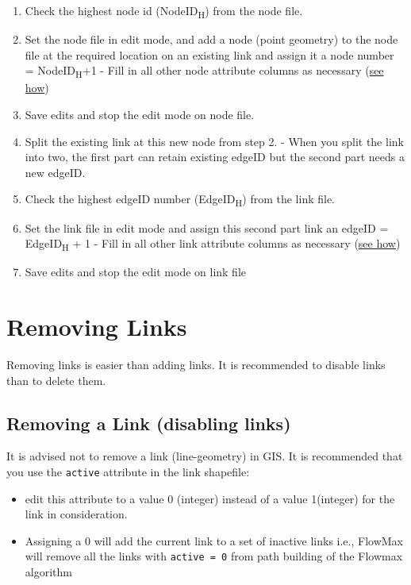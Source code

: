 \documentclass[
]{book}
\providecommand{\tightlist}{%
  \setlength{\itemsep}{0pt}\setlength{\parskip}{0pt}}
\begin{document}
\begin{enumerate}
\def\labelenumi{\arabic{enumi}.}
\tightlist
\item
  Check the highest node id (NodeID\textsubscript{H}) from the node file.
\item
  Set the node file in edit mode, and add a node (point geometry) to the node file at the required location on an existing link and assign it a node number = NodeID\textsubscript{H}+1
  - Fill in all other node attribute columns as necessary (\hyperref[modifying-node-attributes]{see how})
\item
  Save edits and stop the edit mode on node file.
\item
  Split the existing link at this new node from step 2.
  - When you split the link into two, the first part can retain existing edgeID but the second part needs a new edgeID.
\item
  Check the highest edgeID number (EdgeID\textsubscript{H}) from the link file.
\item
  Set the link file in edit mode and assign this second part link an edgeID = EdgeID\textsubscript{H} + 1
  - Fill in all other link attribute columns as necessary (\hyperref[modifying-edge-attributes]{see how})
\item
  Save edits and stop the edit mode on link file
\end{enumerate}

\chapter{Removing Links}\label{removing-links}

Removing links is easier than adding links. It is recommended to disable links than to delete them.

\section{Removing a Link (disabling links)}\label{removing-a-link-disabling-links}

It is advised not to remove a link (line-geometry) in GIS. It is recommended that you use the \texttt{active} attribute in the link shapefile:

\begin{itemize}
\item
  edit this attribute to a value 0 (integer) instead of a value 1(integer) for the link in consideration.
\item
  Assigning a 0 will add the current link to a set of inactive links i.e., FlowMax will remove all the links with \texttt{active\ =\ 0} from path building of the Flowmax algorithm
\end{itemize}
\end{document}
